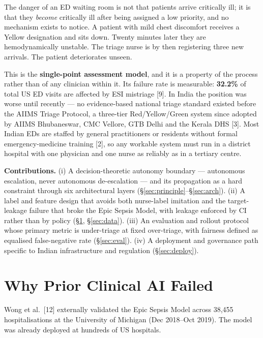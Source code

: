 \documentclass[10pt,a4paper,twocolumn]{article}
\begin{document}
The danger of an ED waiting room is not that patients arrive critically ill; it is
that they \emph{become} critically ill after being assigned a low priority, and no
mechanism exists to notice. A patient with mild chest discomfort receives a Yellow
designation and sits down. Twenty minutes later they are hemodynamically unstable.
The triage nurse is by then registering three new arrivals. The patient
deteriorates unseen.

This is the \textbf{single-point assessment model}, and it is a property of the
process rather than of any clinician within it. Its failure rate is measurable:
\textbf{32.2\%} of total US ED visits are affected by ESI mistriage
[9]. In India the position was worse until recently --- no evidence-based
national triage standard existed before the AIIMS Triage Protocol, a three-tier
Red/Yellow/Green system since adopted by AIIMS Bhubaneswar, CMC Vellore, GTB Delhi
and the Kerala DHS [3]. Most Indian EDs are staffed by general
practitioners or residents without formal emergency-medicine training [2],
so any workable system must run in a district hospital with one physician and one
nurse as reliably as in a tertiary centre.

\textbf{Contributions.} (i) A decision-theoretic autonomy boundary --- autonomous
escalation, never autonomous de-escalation --- and its propagation as a hard
constraint through six architectural layers (\S\ref{sec:principle}--\S\ref{sec:arch}).
(ii) A label and feature design that avoids both nurse-label imitation and the
target-leakage failure that broke the Epic Sepsis Model, with leakage enforced by
CI rather than by policy (\S\ref{sec:prior}, \S\ref{sec:data}).
(iii) An evaluation and rollout protocol whose primary metric is under-triage at
fixed over-triage, with fairness defined as equalised false-negative rate
(\S\ref{sec:eval}).
(iv) A deployment and governance path specific to Indian infrastructure and
regulation (\S\ref{sec:deploy}).

\section{Why Prior Clinical AI Failed}
\label{sec:prior}

Wong et al.\ [12] externally validated the Epic Sepsis Model across
38{,}455 hospitalisations at the University of Michigan (Dec 2018--Oct 2019).
The model was already deployed at hundreds of US hospitals.
\end{document}

